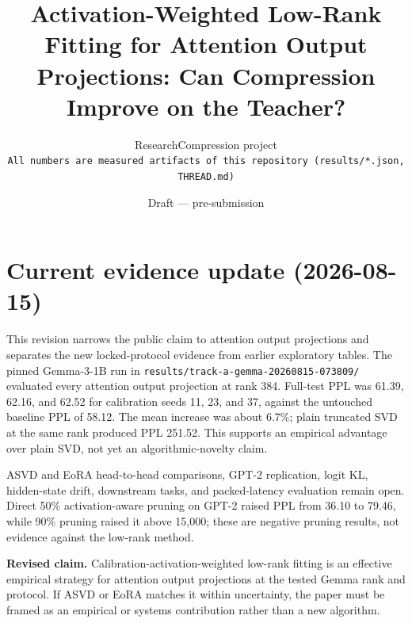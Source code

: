 \documentclass[11pt]{article}
\title{Activation-Weighted Low-Rank Fitting for Attention Output Projections:
Can Compression Improve on the Teacher?}
\author{ResearchCompression project\\
\texttt{All numbers are measured artifacts of this repository (results/*.json, THREAD.md)}}
\date{Draft --- pre-submission}
\begin{document}
\maketitle

\section*{Current evidence update (2026-08-15)}
This revision narrows the public claim to attention output projections and
separates the new locked-protocol evidence from earlier exploratory tables.
The pinned Gemma-3-1B run in
\texttt{results/track-a-gemma-20260815-073809/} evaluated every attention
output projection at rank 384. Full-test PPL was 61.39, 62.16, and 62.52 for
calibration seeds 11, 23, and 37, against the untouched baseline PPL of
58.12. The mean increase was about 6.7\%; plain truncated SVD at the same
rank produced PPL 251.52. This supports an empirical advantage over plain
SVD, not yet an algorithmic-novelty claim.

ASVD and EoRA head-to-head comparisons, GPT-2 replication, logit KL,
hidden-state drift, downstream tasks, and packed-latency evaluation remain
open. Direct 50\% activation-aware pruning on GPT-2 raised PPL from 36.10 to
79.46, while 90\% pruning raised it above 15,000; these are negative pruning
results, not evidence against the low-rank method.

\textbf{Revised claim.} Calibration-activation-weighted low-rank fitting is
an effective empirical strategy for attention output projections at the
tested Gemma rank and protocol. If ASVD or EoRA matches it within uncertainty,
the paper must be framed as an empirical or systems contribution rather than
a new algorithm.
\end{document}
